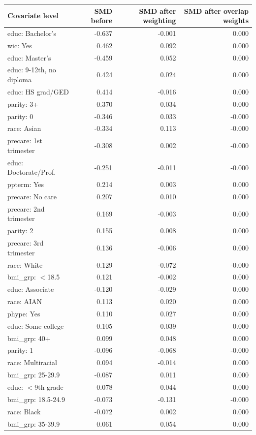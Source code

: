 {\small
\begin{longtable}{lrrr}
\toprule
Covariate level & SMD before & SMD after weighting & SMD after overlap weights \\
\midrule
\endhead
educ: Bachelor's & -0.637 & -0.001 & 0.000 \\
wic: Yes & 0.462 & 0.092 & 0.000 \\
educ: Master's & -0.459 & 0.052 & 0.000 \\
educ: 9-12th, no diploma & 0.424 & 0.024 & 0.000 \\
educ: HS grad/GED & 0.414 & -0.016 & 0.000 \\
parity: 3+ & 0.370 & 0.034 & 0.000 \\
parity: 0 & -0.346 & 0.033 & -0.000 \\
race: Asian & -0.334 & 0.113 & -0.000 \\
precare: 1st trimester & -0.308 & 0.002 & -0.000 \\
educ: Doctorate/Prof. & -0.251 & -0.011 & -0.000 \\
ppterm: Yes & 0.214 & 0.003 & 0.000 \\
precare: No care & 0.207 & 0.010 & 0.000 \\
precare: 2nd trimester & 0.169 & -0.003 & 0.000 \\
parity: 2 & 0.155 & 0.008 & 0.000 \\
precare: 3rd trimester & 0.136 & -0.006 & 0.000 \\
race: White & 0.129 & -0.072 & -0.000 \\
bmi\_grp: $<$18.5 & 0.121 & -0.002 & 0.000 \\
educ: Associate & -0.120 & -0.029 & 0.000 \\
race: AIAN & 0.113 & 0.020 & 0.000 \\
phype: Yes & 0.110 & 0.027 & 0.000 \\
educ: Some college & 0.105 & -0.039 & 0.000 \\
bmi\_grp: 40+ & 0.099 & 0.048 & 0.000 \\
parity: 1 & -0.096 & -0.068 & -0.000 \\
race: Multiracial & 0.094 & -0.014 & 0.000 \\
bmi\_grp: 25-29.9 & -0.087 & 0.011 & 0.000 \\
educ: $<$9th grade & -0.078 & 0.044 & 0.000 \\
bmi\_grp: 18.5-24.9 & -0.073 & -0.131 & -0.000 \\
race: Black & -0.072 & 0.002 & 0.000 \\
bmi\_grp: 35-39.9 & 0.061 & 0.054 & 0.000 \\

\end{longtable}}
